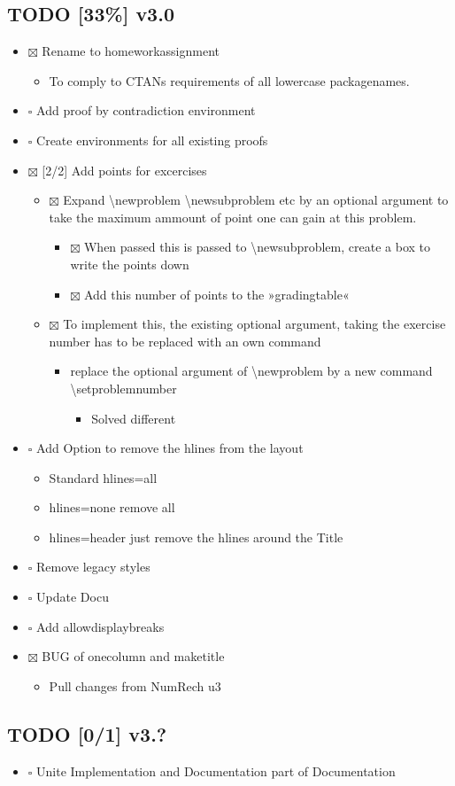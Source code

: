\documentclass[11pt]{article}
\begin{document}
\subsection{{\bfseries\sffamily TODO} [33\%] v3.0}
\label{sec-3-1}
\begin{itemize}
\item $\boxtimes$ Rename to homeworkassignment
\begin{itemize}
\item To comply to CTANs requirements of all lowercase packagenames.
\end{itemize}
\item $\square$ Add proof by contradiction environment
\item $\square$ Create environments for all existing proofs
\item $\boxtimes$ [2/2] Add points for excercises
\begin{itemize}
\item $\boxtimes$ Expand \textbackslash{}newproblem \textbackslash{}newsubproblem etc
by an optional argument to take the maximum ammount of point one
can gain at this problem. 
\begin{itemize}
\item $\boxtimes$ When passed this is passed to \textbackslash{}newsubproblem,
create a box to write the points down
\item $\boxtimes$ Add this number of points to the »gradingtable«
\end{itemize}
\item $\boxtimes$ To implement this, the existing optional argument, taking
the exercise number has to be replaced with an own command
\begin{itemize}
\item replace the optional argument of
\textbackslash{}newproblem by a new command
\textbackslash{}setproblemnumber
\begin{itemize}
\item Solved different
\end{itemize}
\end{itemize}
\end{itemize}
\item $\square$ Add Option to remove the hlines from the layout
\begin{itemize}
\item Standard hlines=all
\item hlines=none remove all
\item hlines=header just remove the hlines around the Title
\end{itemize}
\item $\square$ Remove legacy styles
\item $\square$ Update Docu
\item $\square$ Add allowdisplaybreaks
\item $\boxtimes$ BUG of onecolumn and maketitle
\begin{itemize}
\item Pull changes from NumRech u3
\end{itemize}
\end{itemize}
\subsection{{\bfseries\sffamily TODO} [0/1] v3.?}
\label{sec-3-2}
\begin{itemize}
\item $\square$ Unite Implementation and Documentation part of Documentation
\end{itemize}
\end{document}
